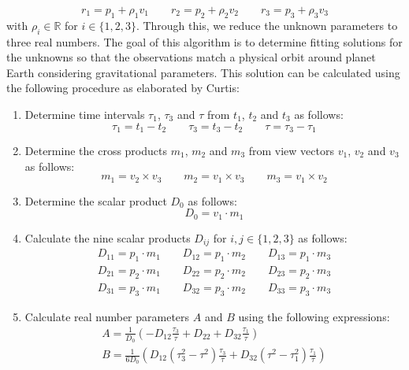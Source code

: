 \documentclass[11pt,a4paper]{article}
\begin{document}
	\begin{equation}
		\label{gauss_algo_r_vectors}
		r_1=p_1+\rho_1v_1 \qquad r_2=p_2+\rho_2v_2 \qquad r_3=p_3+\rho_3v_3
	\end{equation}
	\noindent
	with $\rho_i \in \mathbb{R}$ for $i \in \{1,2,3\}$. Through this, we reduce the unknown parameters to three real numbers. The goal of this algorithm is to determine fitting solutions for the unknowns so that the observations match a physical orbit around planet Earth considering gravitational parameters. This solution can be calculated using the following procedure as elaborated by Curtis:
	
	\begin{enumerate}
		\item Determine time intervals $\tau_1$, $\tau_3$ and $\tau$ from $t_1$, $t_2$ and $t_3$ as follows: 
		\begin{equation}
			\tau_1 = t_1 - t_2 \qquad \tau_3 = t_3 - t_2 \qquad \tau = \tau_3 -\tau_1
		\end{equation}
		
		\item Determine the cross products $m_1$, $m_2$ and $m_3$ from view vectors $v_1$, $v_2$ and $v_3$ as follows:
		\begin{equation}
			m_1=v_2\times v_3 \qquad m_2=v_1\times v_3 \qquad m_3=v_1\times v_2
		\end{equation}
		
		\item Determine the scalar product $D_0$ as follows:
		\begin{equation}
			D_0=v_1\cdot m_1
		\end{equation}
		
		\item Calculate the nine scalar products $D_{ij}$ for $i,j \in \{1,2,3\}$ as follows:
		\begin{equation}
			\begin{aligned}
				D_{11}=p_1\cdot m_1 \qquad D_{12}=p_1\cdot m_2 \qquad D_{13}=p_1\cdot m_3 \\
				D_{21}=p_2\cdot m_1 \qquad D_{22}=p_2\cdot m_2 \qquad D_{23}=p_2\cdot m_3 \\
				D_{31}=p_3\cdot m_1 \qquad D_{32}=p_3\cdot m_2 \qquad D_{33}=p_3\cdot m_3
			\end{aligned}
		\end{equation}
		
		\item Calculate real number parameters $A$ and $B$ using the following expressions:
		\begin{equation}
			\begin{aligned}
				A = \frac{1}{D_0}
				\left(
				-D_{12}\frac{\tau_3}{\tau}
				+ D_{22}
				+ D_{32}\frac{\tau_1}{\tau}
				\right) \\
				B = \frac{1}{6D_0}
				\left(
				D_{12}\left(\tau_3^2-\tau^2\right)\frac{\tau_3}{\tau}
				+
				D_{32}\left(\tau^2-\tau_1^2\right)\frac{\tau_1}{\tau}
				\right)
			\end{aligned}
		\end{equation}
		

\end{enumerate}
\end{document}
